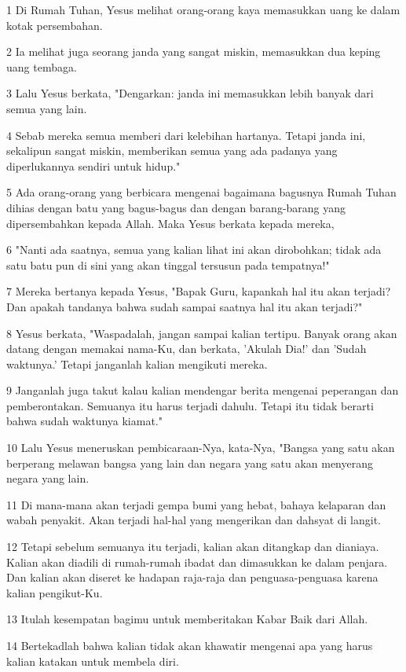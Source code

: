 \par 1 Di Rumah Tuhan, Yesus melihat orang-orang kaya memasukkan uang ke dalam kotak persembahan.
\par 2 Ia melihat juga seorang janda yang sangat miskin, memasukkan dua keping uang tembaga.
\par 3 Lalu Yesus berkata, "Dengarkan: janda ini memasukkan lebih banyak dari semua yang lain.
\par 4 Sebab mereka semua memberi dari kelebihan hartanya. Tetapi janda ini, sekalipun sangat miskin, memberikan semua yang ada padanya yang diperlukannya sendiri untuk hidup."
\par 5 Ada orang-orang yang berbicara mengenai bagaimana bagusnya Rumah Tuhan dihias dengan batu yang bagus-bagus dan dengan barang-barang yang dipersembahkan kepada Allah. Maka Yesus berkata kepada mereka,
\par 6 "Nanti ada saatnya, semua yang kalian lihat ini akan dirobohkan; tidak ada satu batu pun di sini yang akan tinggal tersusun pada tempatnya!"
\par 7 Mereka bertanya kepada Yesus, "Bapak Guru, kapankah hal itu akan terjadi? Dan apakah tandanya bahwa sudah sampai saatnya hal itu akan terjadi?"
\par 8 Yesus berkata, "Waspadalah, jangan sampai kalian tertipu. Banyak orang akan datang dengan memakai nama-Ku, dan berkata, 'Akulah Dia!' dan 'Sudah waktunya.' Tetapi janganlah kalian mengikuti mereka.
\par 9 Janganlah juga takut kalau kalian mendengar berita mengenai peperangan dan pemberontakan. Semuanya itu harus terjadi dahulu. Tetapi itu tidak berarti bahwa sudah waktunya kiamat."
\par 10 Lalu Yesus meneruskan pembicaraan-Nya, kata-Nya, "Bangsa yang satu akan berperang melawan bangsa yang lain dan negara yang satu akan menyerang negara yang lain.
\par 11 Di mana-mana akan terjadi gempa bumi yang hebat, bahaya kelaparan dan wabah penyakit. Akan terjadi hal-hal yang mengerikan dan dahsyat di langit.
\par 12 Tetapi sebelum semuanya itu terjadi, kalian akan ditangkap dan dianiaya. Kalian akan diadili di rumah-rumah ibadat dan dimasukkan ke dalam penjara. Dan kalian akan diseret ke hadapan raja-raja dan penguasa-penguasa karena kalian pengikut-Ku.
\par 13 Itulah kesempatan bagimu untuk memberitakan Kabar Baik dari Allah.
\par 14 Bertekadlah bahwa kalian tidak akan khawatir mengenai apa yang harus kalian katakan untuk membela diri.
